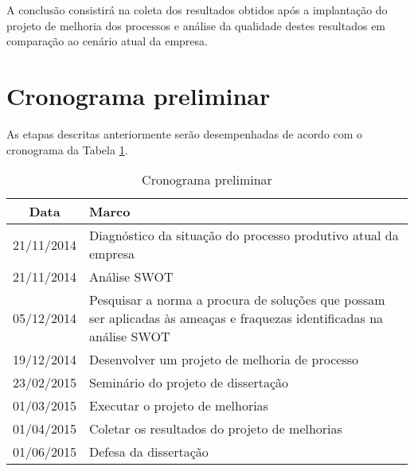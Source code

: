 
A conclusão consistirá na coleta dos resultados obtidos após a implantação do projeto de melhoria dos processos e análise da qualidade destes resultados em comparação ao cenário atual da empresa.

\section{Cronograma preliminar}

As etapas descritas anteriormente serão desempenhadas de acordo com o cronograma da Tabela \ref{tab:crono}.

\begin{table}[h!]\footnotesize
\centering
\begin{tabular}{|c|p{12cm}|}
\hline

	\textbf{Data}&
	\textbf{Marco}\\
\hline

	21/11/2014&Diagnóstico da situação do processo produtivo atual da empresa\\
\hline

	21/11/2014&Análise SWOT\\
\hline

	05/12/2014&Pesquisar a norma \iso a procura de soluções que possam ser aplicadas às ameaças e fraquezas identificadas na análise SWOT\\
\hline

	19/12/2014&Desenvolver um projeto de melhoria de processo\\
\hline

	23/02/2015&Seminário do projeto de dissertação\\
\hline

	01/03/2015&Executar o projeto de melhorias\\
\hline

	01/04/2015&Coletar os resultados do projeto de melhorias\\
\hline

	01/06/2015&Defesa da dissertação\\
\hline

\end{tabular}
\caption {Cronograma preliminar}
\label{tab:crono}
\end{table}